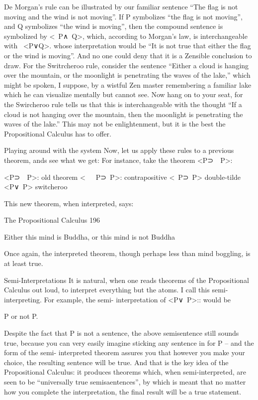         De Morgan’s rule can be illustrated by our familiar sentence “The flag is not
moving and the wind is not moving”. If P symbolizes “the flag is not moving”, and Q
symbolizes “the wind is moving”, then the compound sentence is symbolized by
<~P∧~Q>, which, according to Morgan’s law, is interchangeable with ~<P∨Q>. whose
interpretation would be “It is not true that either the flag or the wind is moving”. And no
one could deny that it is a Zensible conclusion to draw.
        For the Switrcheroo rule, consider the sentence “Either a cloud is hanging over
the mountain, or the moonlight is penetrating the waves of the lake,” which might be
spoken, I suppose, by a wistful Zen master remembering a familiar lake which he can
visualize mentally but cannot see. Now hang on to your seat, for the Swircheroo rule tells
us that this is interchangeable with the thought “If a cloud is not hanging over the
mountain, then the moonlight is penetrating the waves of the lake.” This may not be
enlightenment, but it is the best the Propositional Calculus has to offer.

                          Playing around with the system
Now, let us apply these rules to a previous theorem, ands see what we get: For instance,
take the theorem <P⊃~~P>:

<P⊃~~P>:                      old theorem
<~~~P⊃~P>:                    contrapositive
<~P⊃~P>                       double-tilde
<P∨~P>                        switcheroo

This new theorem, when interpreted, says:




The Propositional Calculus                                                             196

       Either this mind is Buddha, or this mind is not Buddha

Once again, the interpreted theorem, though perhaps less than mind boggling, is at least
true.

                                 Semi-Interpretations
It is natural, when one reads theorems of the Propositional Calculus out loud, to interpret
everything but the atoms. I call this semi-interpreting. For example, the semi-
interpretation of <P∨~P>:: would be

                                        P or not P.

Despite the fact that P is not a sentence, the above semisentence still sounds true, because
you can very easily imagine sticking any sentence in for P – and the form of the semi-
interpreted theorem assures you that however you make your choice, the resulting
sentence will be true. And that is the key idea of the Propositional Calculus: it produces
theorems which, when semi-interpreted, are seen to be “universally true semisaentences”,
by which is meant that no matter how you complete the interpretation, the final result will
be a true statement.

